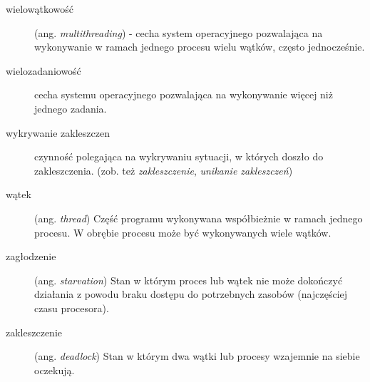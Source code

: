 \documentclass[12pt]{article}
\begin{document}
\begin{description}
    \item[wielowątkowość] (ang. \emph{multithreading}) - cecha system operacyjnego pozwalająca na wykonywanie w ramach jednego procesu wielu wątków, często jednocześnie.
    \item[wielozadaniowość] cecha systemu operacyjnego pozwalająca na wykonywanie więcej niż jednego zadania.
    \item[wykrywanie zakleszczen] czynność polegająca na wykrywaniu sytuacji, w których doszło do zakleszczenia. (zob. też \emph{zakleszczenie}, \emph{unikanie zakleszczeń})
    \item[wątek] (ang. \emph{thread}) Część programu wykonywana współbieżnie w ramach jednego procesu. W obrębie procesu może być wykonywanych wiele wątków.
    \item[zagłodzenie] (ang. \emph{starvation}) Stan w którym proces lub wątek nie może dokończyć działania z powodu braku dostępu do potrzebnych zasobów (najczęściej czasu procesora).
    \item[zakleszczenie] (ang. \emph{deadlock}) Stan w którym dwa wątki lub procesy wzajemnie na siebie oczekują.
\end{description}
\end{document}
